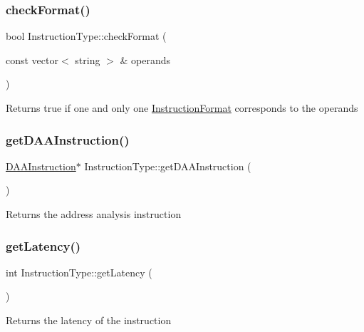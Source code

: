 \subsubsection{\texorpdfstring{check\+Format()}{checkFormat()}}
{\footnotesize\ttfamily bool Instruction\+Type\+::check\+Format (\begin{DoxyParamCaption}\item[{const vector$<$ string $>$ \&}]{operands }\end{DoxyParamCaption})}

Returns true if one and only one \hyperlink{classInstructionFormat}{Instruction\+Format} corresponds to the operands \mbox{\label{classInstructionType_aed61394dd1528a3a68c09bef157e6da8}} 
\subsubsection{\texorpdfstring{get\+D\+A\+A\+Instruction()}{getDAAInstruction()}}
{\footnotesize\ttfamily \hyperlink{classDAAInstruction}{D\+A\+A\+Instruction}$\ast$ Instruction\+Type\+::get\+D\+A\+A\+Instruction (\begin{DoxyParamCaption}{ }\end{DoxyParamCaption})}

Returns the address analysis instruction \mbox{\label{classInstructionType_a737bd48f4e73da7c3a52faa052d9edfe}} 
\subsubsection{\texorpdfstring{get\+Latency()}{getLatency()}}
{\footnotesize\ttfamily int Instruction\+Type\+::get\+Latency (\begin{DoxyParamCaption}{ }\end{DoxyParamCaption})}

Returns the latency of the instruction \mbox{\label{classInstructionType_adf12516c59a85e8032770feec2e1dcae}} 
